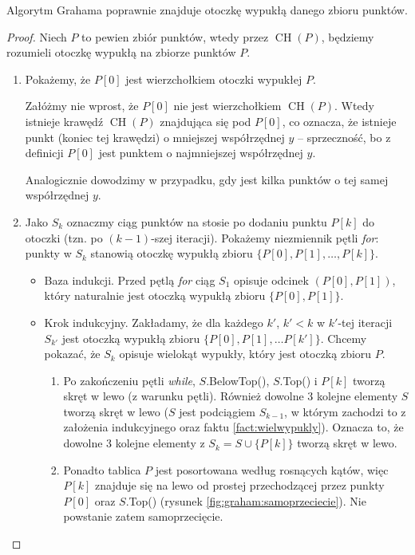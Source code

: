 \begin{theorem}
	Algorytm Grahama poprawnie znajduje otoczkę wypukłą danego zbioru punktów.
	\begin{proof}
		Niech $P$ to pewien zbiór punktów, wtedy przez $\operatorname{CH}(P)$, będziemy rozumieli otoczkę wypukłą na zbiorze punktów $P$.
		\phantom{a}
		\begin{enumerate}
			\item Pokażemy, że $P[0]$ jest wierzchołkiem otoczki wypukłej $P$. 
			
			Załóżmy nie wprost, że $P[0]$ nie jest wierzchołkiem $\operatorname{CH}(P)$. Wtedy istnieje krawędź $\operatorname{CH}(P)$ znajdująca się pod $P[0]$, co oznacza, że istnieje punkt (koniec tej krawędzi) o mniejszej współrzędnej $y$ -- sprzeczność, bo z definicji $P[0]$ jest punktem o najmniejszej współrzędnej $y$.
			
			Analogicznie dowodzimy w przypadku, gdy jest kilka punktów o tej samej współrzędnej $y$.
		
			\item Jako $S_k$ oznaczmy ciąg punktów na stosie po dodaniu punktu $P[k]$ do otoczki (tzn. po $(k-1)$-szej iteracji). Pokażemy niezmiennik pętli \textit{for}: punkty w $S_{k}$ stanowią otoczkę wypukłą zbioru $\{P[0], P[1], \dots, P[k]\}$.
			
			\begin{itemize}
				\item Baza indukcji. Przed pętlą \textit{for} ciąg $S_1$ opisuje odcinek $(P[0], P[1])$, który naturalnie jest otoczką wypukłą zbioru  $\{P[0], P[1]\}$.
				
				\item Krok indukcyjny. Zakładamy, że dla każdego $k'$, $k'<k$ w $k'$-tej iteracji $S_{k'}$ jest otoczką wypukłą zbioru $\{P[0], P[1], \dots P[k']\}$. 
				Chcemy pokazać, że $S_k$ opisuje wielokąt wypukły, który jest otoczką zbioru $P$.
				
				\begin{enumerate}				
					\item Po zakończeniu pętli \textit{while}, $S$.BelowTop(), $S$.Top() i $P[k]$ tworzą skręt w lewo (z warunku pętli). Również dowolne 3 kolejne elementy $S$ tworzą skręt w lewo ($S$ jest podciągiem $S_{k-1}$, w którym zachodzi to z założenia indukcyjnego oraz faktu \ref{fact:wielwypukly}). Oznacza to, że dowolne 3 kolejne elementy z $S_k = S \cup \{P[k]\}$ tworzą skręt w lewo. 
					
					\item Ponadto tablica $P$ jest posortowana według rosnących kątów, więc $P[k]$ znajduje się na lewo od prostej przechodzącej przez punkty $P[0]$ oraz $S$.Top() (rysunek \ref{fig:graham:samoprzeciecie}). Nie powstanie zatem samoprzecięcie.
					

\end{enumerate}
\end{itemize}
\end{enumerate}
\end{proof}
\end{theorem}
